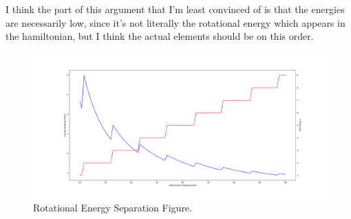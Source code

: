 \documentclass[prl, longbibliography]{revtex4-2}
\begin{document}
I think the part of this argument that I'm least convinced of is that the energies are necessarily low, since it's not literally the rotational energy which appears in the hamiltonian, but I think the actual elements should be on this order. 

\begin{figure}
  \includegraphics[width=\linewidth]{Rotational_Energy_Separation.png}
  \caption{Rotational Energy Separation Figure.}
  \label{fig:boat1}
\end{figure}


\end{document}
